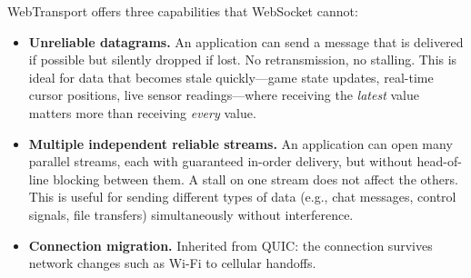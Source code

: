 \documentclass[11pt]{article}
\begin{document}
WebTransport offers three capabilities that WebSocket cannot:

\begin{itemize}
  \item \textbf{Unreliable datagrams.}  An application can send a message
    that is delivered if possible but silently dropped if lost.  No
    retransmission, no stalling.  This is ideal for data that becomes stale
    quickly---game state updates, real-time cursor positions, live sensor
    readings---where receiving the \emph{latest} value matters more than
    receiving \emph{every} value.

  \item \textbf{Multiple independent reliable streams.}  An application can
    open many parallel streams, each with guaranteed in-order delivery, but
    without head-of-line blocking between them.  A stall on one stream does
    not affect the others.  This is useful for sending different types of
    data (e.g., chat messages, control signals, file transfers)
    simultaneously without interference.

  \item \textbf{Connection migration.}  Inherited from QUIC: the
    connection survives network changes such as Wi-Fi to cellular handoffs.
\end{itemize}
\end{document}
